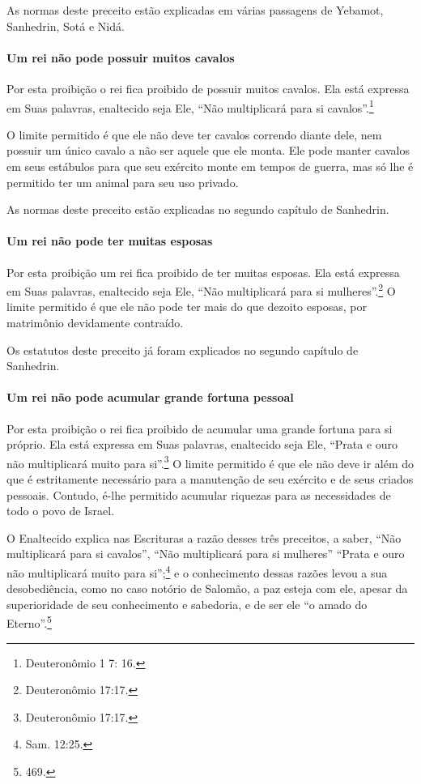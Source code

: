 As normas deste preceito estão explicadas em várias passagens de
Yebamot, Sanhedrin, Sotá e Nidá.

\paragraph{Um rei não pode possuir muitos cavalos}

Por esta proibição o rei fica proibido de possuir muitos cavalos. Ela
está expressa em Suas palavras, enaltecido seja Ele, ``Não multiplicará
para si cavalos''.\footnote{Deuteronômio 1 7: 16.}

O limite permitido é que ele não deve ter cavalos correndo diante dele,
nem possuir um único cavalo a não ser aquele que ele monta. Ele pode
manter cavalos em seus estábulos para que seu exército monte em tempos
de guerra, mas só lhe é permitido ter um animal para seu uso privado.

As normas deste preceito estão explicadas no segundo capítulo de Sanhedrin.

\paragraph{Um rei não pode ter muitas esposas}

Por esta proibição um rei fica proibido de ter muitas esposas. Ela está
expressa em Suas palavras, enaltecido seja Ele, ``Não multiplicará para
si mulheres''.\footnote{Deuteronômio 17:17.} O limite permitido é que ele não
pode ter mais do que dezoito esposas, por matrimônio devidamente
contraído.

Os estatutos deste preceito já foram explicados no segundo capítulo de
Sanhedrin.

\paragraph{Um rei não pode acumular grande fortuna pessoal}

Por esta proibição o rei fica proibido de acumular uma grande fortuna
para si próprio. Ela está expressa em Suas palavras, enaltecido seja
Ele, ``Prata e ouro não multiplicará muito para si''.\footnote{Deuteronômio
17:17.} O limite permitido é que ele não deve ir além do que é
estritamente necessário para a manutenção de seu exército e de seus
criados pessoais. Contudo, é-lhe permitido acumular riquezas para as
necessidades de todo o povo de Israel.

O Enaltecido explica nas Escrituras a razão desses três preceitos, a
saber, ``Não multiplicará para si cavalos'', ``Não multiplicará para si
mulheres'' ``Prata e ouro não multiplicará muito para
si'';\footnote{Sam. 12:25.} e o conhecimento dessas razões levou a sua
desobediência, como no caso notório de Salomão, a paz esteja com ele,
apesar da superioridade de seu conhecimento e sabedoria, e de ser ele
``o amado do Eterno''.\footnote{469.}

